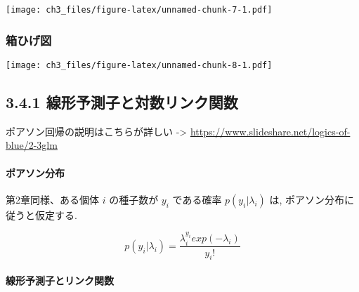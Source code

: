 \documentclass[
]{article}
\newenvironment{Shaded}{\begin{snugshade}}{\end{snugshade}}
\newcommand{\AttributeTok}[1]{\textcolor[rgb]{0.77,0.63,0.00}{#1}}
\newcommand{\DecValTok}[1]{\textcolor[rgb]{0.00,0.00,0.81}{#1}}
\newcommand{\FunctionTok}[1]{\textcolor[rgb]{0.00,0.00,0.00}{#1}}
\newcommand{\NormalTok}[1]{#1}
\newcommand{\SpecialCharTok}[1]{\textcolor[rgb]{0.00,0.00,0.00}{#1}}
\newcommand{\StringTok}[1]{\textcolor[rgb]{0.31,0.60,0.02}{#1}}
\begin{document}
\texttt{[image: ch3\_files/figure-latex/unnamed-chunk-7-1.pdf]}

\hypertarget{ux7bb1ux3072ux3052ux56f3}{%
\subsubsection{箱ひげ図}\label{ux7bb1ux3072ux3052ux56f3}}

\begin{Shaded}
\end{Shaded}

\texttt{[image: ch3\_files/figure-latex/unnamed-chunk-8-1.pdf]}

\hypertarget{ux7ddaux5f62ux4e88ux6e2cux5b50ux3068ux5bfeux6570ux30eaux30f3ux30afux95a2ux6570}{%
\subsection{3.4.1
線形予測子と対数リンク関数}\label{ux7ddaux5f62ux4e88ux6e2cux5b50ux3068ux5bfeux6570ux30eaux30f3ux30afux95a2ux6570}}

ポアソン回帰の説明はこちらが詳しい -\textgreater{}
\url{https://www.slideshare.net/logics-of-blue/2-3glm}

\hypertarget{ux30ddux30a2ux30bdux30f3ux5206ux5e03}{%
\paragraph{ポアソン分布}\label{ux30ddux30a2ux30bdux30f3ux5206ux5e03}}

第2章同様、ある個体 \(i\) の種子数が \(y_i\) である確率
\(p(y_i|\lambda_i)\) は, ポアソン分布に従うと仮定する.

\[
  p(y_i | \lambda_i) = \frac{\lambda_i^{y_i} exp(-\lambda_i)}{y_i !}
\]

\hypertarget{ux7ddaux5f62ux4e88ux6e2cux5b50ux3068ux30eaux30f3ux30afux95a2ux6570}{%
\paragraph{線形予測子とリンク関数}\label{ux7ddaux5f62ux4e88ux6e2cux5b50ux3068ux30eaux30f3ux30afux95a2ux6570}}
\end{document}
